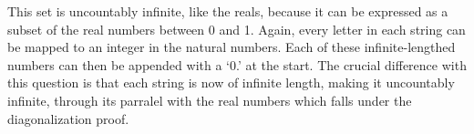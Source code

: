 \documentclass[11pt]{article}
\begin{document}
\begin{solution}
\begin{Parts}
    \Part This set is uncountably infinite, like the reals, because it can be expressed
    as a subset of the real numbers between 0 and 1. Again, every letter in each
    string can be mapped to an integer in the natural numbers. Each of these
    infinite-lengthed numbers can then be appended with a `0.' at the start. The
    crucial difference with this question is that each string is now of infinite 
    length, making it uncountably infinite, through its parralel with the real 
    numbers which falls under the diagonalization proof. 

    \end{Parts}
\end{solution}
\end{document}
